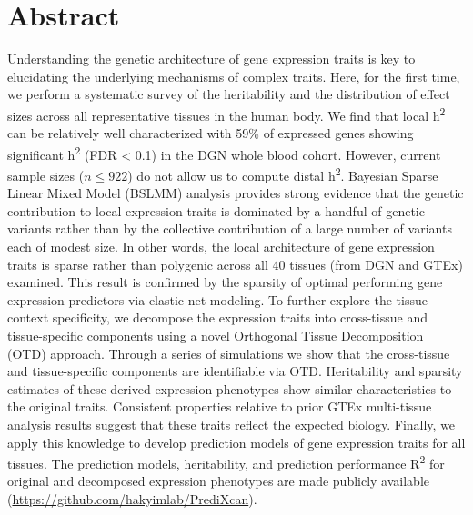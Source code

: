 \documentclass[10pt,letterpaper]{article}
\begin{document}
\pagebreak{}

\section*{Abstract}
Understanding the genetic architecture of gene expression traits is key to elucidating the underlying mechanisms of complex traits. Here, for the first time, we perform a systematic survey of the heritability and the distribution of effect sizes across all representative tissues in the human body. We find that local h\textsuperscript{2} can be relatively well characterized with 59\% of expressed genes showing significant h\textsuperscript{2} (FDR \textless{} 0.1) in the DGN whole blood cohort. However, current sample sizes ($n\le922$) do not allow us to compute distal h\textsuperscript{2}. Bayesian Sparse Linear Mixed Model (BSLMM) analysis provides strong evidence that the genetic contribution to local expression traits is dominated by a handful of genetic variants rather than by the collective contribution of a large number of variants each of modest size. In other words, the local architecture of gene expression traits is sparse rather than polygenic across all 40 tissues (from DGN and GTEx) examined. This result is confirmed by the sparsity of optimal performing gene expression predictors via elastic net modeling. To further explore the tissue context specificity, we decompose the expression traits into cross-tissue and tissue-specific components using a novel Orthogonal Tissue Decomposition (OTD) approach. Through a series of simulations we show that the cross-tissue and tissue-specific components are identifiable via OTD. Heritability and sparsity estimates of these derived expression phenotypes show similar characteristics to the original traits. Consistent properties relative to prior GTEx multi-tissue analysis results suggest that these traits reflect the expected biology. Finally, we apply this knowledge to develop prediction models of gene expression traits for all tissues. The prediction models, heritability, and prediction performance R\textsuperscript{2} for original and decomposed expression phenotypes are made publicly available (\url{https://github.com/hakyimlab/PrediXcan}).

\end{document}

